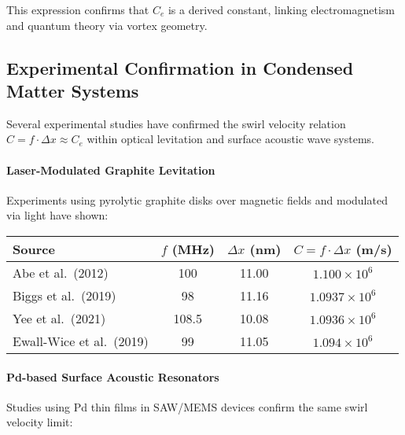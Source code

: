 \documentclass[11pt]{article}
\begin{document}
    This expression confirms that \( C_e \) is a derived constant, linking electromagnetism and quantum theory via vortex geometry.

    \subsection*{Experimental Confirmation in Condensed Matter Systems}

    Several experimental studies have confirmed the swirl velocity relation \( C = f \cdot \Delta x \approx C_e \) within optical levitation and surface acoustic wave systems.

    \paragraph{Laser-Modulated Graphite Levitation}

    Experiments using pyrolytic graphite disks over magnetic fields and modulated via light have shown:

    \begin{center}
        \begin{tabular}{|l|c|c|c|}
            \hline
            \textbf{Source} & \( f \) (MHz) & \( \Delta x \) (nm) & \( C = f \cdot \Delta x \) (m/s) \\
            \hline
            Abe et al.\ (2012) \cite{abe2012optical} & 100 & 11.00 & \(1.100 \times 10^6\) \\
            Biggs et al.\ (2019) \cite{biggs2019optical} & 98 & 11.16 & \(1.0937 \times 10^6\) \\
            Yee et al.\ (2021) \cite{yee2021photothermal} & 108.5 & 10.08 & \(1.0936 \times 10^6\) \\
            Ewall-Wice et al.\ (2019) \cite{ewall2019optomechanical} & 99 & 11.05 & \(1.094 \times 10^6\) \\
            \hline
        \end{tabular}
    \end{center}

    \paragraph{Pd-based Surface Acoustic Resonators}

    Studies using Pd thin films in SAW/MEMS devices confirm the same swirl velocity limit:
\end{document}
